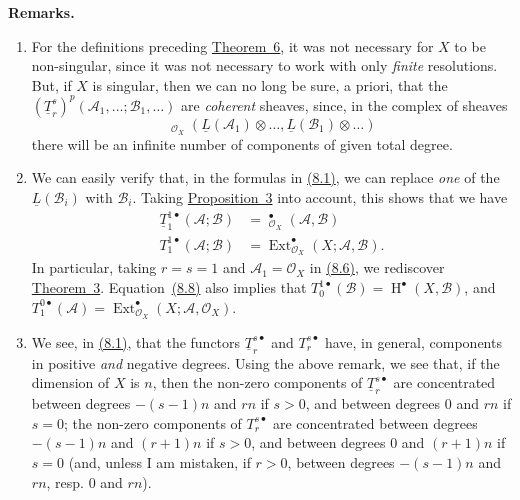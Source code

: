 \documentclass{article}
\newenvironment{rmenv}[1]
  {\phantomsection\par\medskip\noindent\textbf{#1.}\rmfamily}
  {\par\medskip}
\newcommand{\scr}[1]{{\mathscr{#1}}}
\DeclareMathOperator{\Ext}{Ext}
\DeclareMathOperator{\shExt}{\underline{Ext}}
\DeclareMathOperator{\shHom}{\underline{Hom}}
\DeclareMathOperator{\HH}{H}
\newcommand{\oldpage}[1]{\marginpar{\footnotesize$\Big\vert$ \textit{p.~#1}}}
\begin{document}
\oldpage{149-24}
\begin{rmenv}{Remarks}
  \begin{enumerate}
    \item For the definitions preceding \hyperref[theorem6]{Theorem~6}, it was not necessary for $X$ to be non-singular, since it was not necessary to work with only \emph{finite} resolutions.
      But, if $X$ is singular, then we can no long be sure, a priori, that the $(\underline{T}_r^s)^p(\scr{A}_1,\ldots;\scr{B}_1,\ldots)$ are \emph{coherent} sheaves, since, in the complex of sheaves
      \[
        \shHom_{\scr{O}_X}(\underline{L}(\scr{A}_1)\otimes\ldots,\underline{L}(\scr{B}_1)\otimes\ldots)
      \]
      there will be an infinite number of components of given total degree.
    \item We can easily verify that, in the formulas in \hyperref[8.1]{(8.1)}, we can replace \emph{one} of the $\underline{L}(\scr{B}_i)$ with $\scr{B}_i$.
      Taking \hyperref[proposition3]{Proposition~3} into account, this shows that we have
      \[
      \label{8.8}
        \begin{aligned}
          \underline{T}_1^{1\bullet}(\scr{A};\scr{B})
          &= \shExt_{\scr{O}_X}^\bullet(\scr{A},\scr{B})
        \\T_1^{1\bullet}(\scr{A};\scr{B})
          &= \Ext_{\scr{O}_X}^\bullet(X;\scr{A},\scr{B}).
        \end{aligned}
      \tag{8.8}
      \]
      In particular, taking $r=s=1$ and $\scr{A}_1=\scr{O}_X$ in \hyperref[8.6]{(8.6)}, we rediscover \hyperref[theorem3]{Theorem~3}.
      Equation~\hyperref[8.8]{(8.8)} also implies that $T_0^{1\bullet}(\scr{B})=\HH^\bullet(X,\scr{B})$, and $T_1^{0\bullet}(\scr{A})=\Ext_{\scr{O}_X}^\bullet(X;\scr{A},\scr{O}_X)$.
    \item We see, in \hyperref[8.1]{(8.1)}, that the functors $\underline{T}_r^{s\bullet}$ and $T_r^{s\bullet}$ have, in general, components in positive \emph{and} negative degrees.
      Using the above remark, we see that, if the dimension of $X$ is $n$, then the non-zero components of $\underline{T}_r^{s\bullet}$ are concentrated between degrees $-(s-1)n$ and $rn$ if $s>0$, and between degrees $0$ and $rn$ if $s=0$; the non-zero components of $T_r^{s\bullet}$ are concentrated between degrees $-(s-1)n$ and $(r+1)n$ if $s>0$, and between degrees $0$ and $(r+1)n$ if $s=0$ (and, unless I am mistaken, if $r>0$, between degrees $-(s-1)n$ and $rn$, resp. $0$ and $rn$).
  \end{enumerate}
\end{rmenv}
\end{document}
